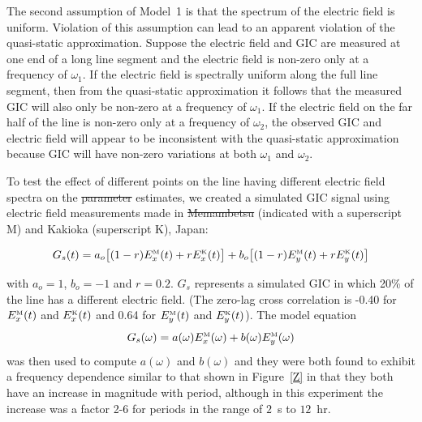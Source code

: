\documentclass[draft,linenumbers]{agujournal2018}
\providecommand{\DIFaddtex}[1]{{\protect\color{blue}\uwave{#1}}} %
\providecommand{\DIFdeltex}[1]{{\protect\color{red}\sout{#1}}}                      %
\providecommand{\DIFaddbegin}{} %
\providecommand{\DIFaddend}{} %
\providecommand{\DIFdelbegin}{} %
\providecommand{\DIFdelend}{} %
\providecommand{\DIFadd}[1]{\texorpdfstring{\DIFaddtex{#1}}{#1}} %
\providecommand{\DIFdel}[1]{\texorpdfstring{\DIFdeltex{#1}}{}} %
\begin{document}
The second assumption of Model~1 is that the spectrum of the electric field is uniform. Violation of this assumption can lead to an apparent violation of the quasi-static approximation. Suppose the electric field and GIC are measured at one end of a long line segment and the electric field is non-zero only at a frequency of $\omega_1$. If the electric field is spectrally uniform along the full line segment, then from the quasi-static approximation it follows that the measured GIC will also only be non-zero at a frequency of $\omega_1$. If the electric field on the far half of the line is non-zero only at a frequency of $\omega_2$, the observed GIC and electric field will appear to be inconsistent with the quasi-static approximation because GIC will have non-zero variations at both $\omega_1$ and $\omega_2$.

To test the effect of different points on the line having different electric field spectra on the \DIFdelbegin \DIFdel{parameter }\DIFdelend \DIFaddbegin \DIFadd{coefficient }\DIFaddend estimates, we created a simulated GIC signal using electric field measurements made in \DIFdelbegin \DIFdel{Memambetsu }\DIFdelend \DIFaddbegin \DIFadd{Memanbetsu }\DIFaddend (indicated with a superscript M) and Kakioka (superscript K), Japan:

\begin{equation}
  G_s(t)=a_o\big[(1-r)E^{\mbox{\tiny M}}_x(t) + rE^{\mbox{\tiny K}}_x(t)\big]+b_o\big[(1-r)E^{\mbox{\tiny M}}_y(t) + rE^{\mbox{\tiny K}}_y(t)\big]
\end{equation}

\noindent
with $a_o=1$, $b_o=-1$ and $r=0.2$. $G_s$ represents a simulated GIC in which 20\% of the line has a different electric field. (The zero-lag cross correlation is -0.40 for $E^{\mbox{\tiny M}}_x(t)$ and $E^{\mbox{\tiny K}}_x(t)$ and 0.64 for $E^{\mbox{\tiny M}}_y(t)$ and $E^{\mbox{\tiny K}}_y(t)$). The model equation
\begin{equation}
  G_s(\omega)=a(\omega)E^{\mbox{\tiny M}}_x(\omega)+b(\omega)E^{\mbox{\tiny M}}_y(\omega)
\end{equation}
\noindent
was then used to compute $a(\omega)$ and $b(\omega)$ and they were both found to exhibit a frequency dependence similar to that shown in Figure~\ref{Z} in that they both have an increase in magnitude with period, although in this experiment the increase was a factor 2-6 for periods in the range of $2$~s to $12$~hr.
\end{document}
